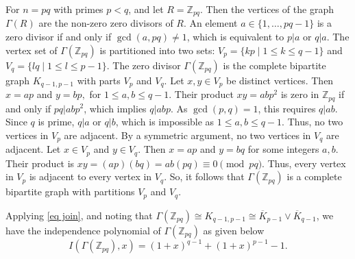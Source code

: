 \documentclass[12pt,twoside]{article}
\begin{document}
For $n=pq$ with primes $p<q$, and let $R = \mathbb{Z}_{pq}$. Then the vertices of the graph $\varGamma(R)$ are the non-zero zero divisors of $R$. An element $a \in \{1, \dots, pq-1\}$ is a zero divisor if and only if $\gcd(a, pq) \neq 1$, which is equivalent to $p|a$ or $q|a$. The vertex set of $\varGamma(\mathbb{Z}_{pq})$ is partitioned into two sets: $V_p = \{kp \mid 1 \le k \le q-1\}$ and $V_q = \{lq \mid 1 \le l \le p-1\}$. The zero divisor $\varGamma(\mathbb{Z}_{pq})$ is the complete bipartite graph $K_{q-1, p-1}$ with parts $V_p$ and $V_q$.  Let $x,y \in V_p$ be distinct vertices. Then $x=ap$ and $y=bp,$ for $1 \le a, b \le q-1$. Their product $xy = abp^2$ is zero in $\mathbb{Z}_{pq}$ if and only if $pq|abp^2$, which implies $q|abp$. As $\gcd(p,q)=1$, this requires $q|ab$. Since $q$ is prime, $q|a$ or $q|b$, which is impossible as $1 \le a,b \le q-1$. Thus, no two vertices in $V_p$ are adjacent. By a symmetric argument, no two vertices in $V_q$ are adjacent.  Let $x \in V_p$ and $y \in V_q$. Then $x=ap$ and $y=bq$ for some integers $a,b$. Their product is $xy = (ap)(bq) = ab(pq) \equiv 0 \pmod{pq}$. Thus, every vertex in $V_p$ is adjacent to every vertex in $V_q$.
So, it follows that $\varGamma(\mathbb{Z}_{pq})$ is a complete bipartite graph with partitions $V_p$ and $V_q$. 

Applying \eqref{eq join}, and noting that  $\varGamma(\mathbb{Z}_{pq}) \cong K_{q-1, p-1}\cong \overline{K}_{p-1}\vee \overline{K}_{q-1}$, we have the independence polynomial of $ \varGamma(\mathbb{Z}_{pq})$ as given below
\begin{equation}\label{ind poly zpq}
	I(\varGamma(\mathbb{Z}_{pq}), x) = (1+x)^{q-1} + (1+x)^{p-1} - 1.
\end{equation}
\end{document}
